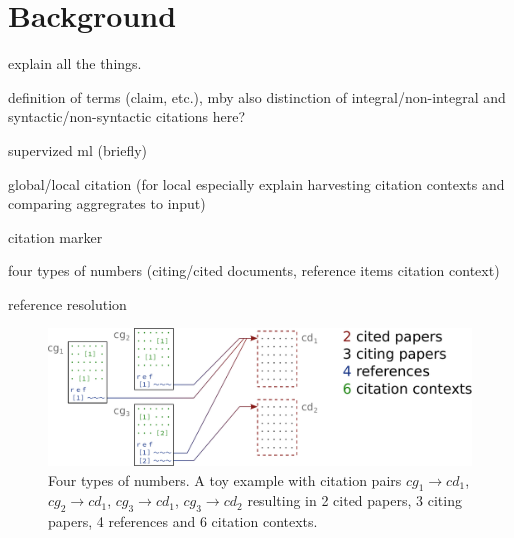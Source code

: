 \chapter{Background}\label{chap:background}
explain all the things.

definition of terms (claim, etc.), mby also distinction of integral/non-integral and syntactic/non-syntactic citations here?

supervized ml (briefly)

global/local citation (for local especially explain harvesting citation contexts and comparing aggregrates to input)

citation marker

four types of numbers (citing/cited documents, reference items citation context)

reference resolution

\begin{figure}
  \centering
    \includegraphics[width=\textwidth]{figures/background/four_types_of_numbers_vertsqueeze.pdf}
  \caption[Four types of numbers.]{Four types of numbers. A toy example with citation pairs $cg_1\rightarrow cd_1$, $cg_2\rightarrow cd_1$, $cg_3\rightarrow cd_1$, $cg_3\rightarrow cd_2$ resulting in 2 cited papers, 3 citing papers, 4 references and 6 citation contexts.}
  \label{fig:fournumbers}
\end{figure}

